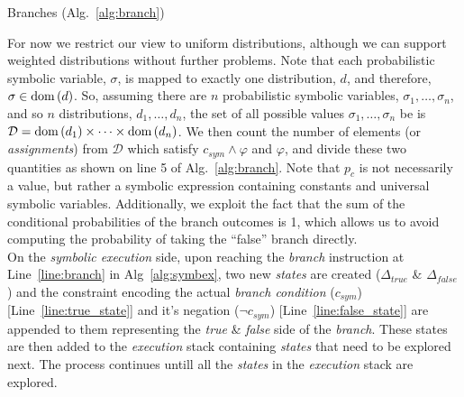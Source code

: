 \begin{paragraph}{Branches (Alg.~\ref{alg:branch})}
	
	For now we restrict our view to uniform distributions, although we can support weighted distributions without further problems.
	Note that each probabilistic symbolic variable, $\sigma$, is mapped to exactly one distribution, $d$, and therefore, $\sigma \in \mathrm{dom}\left( d \right)$.
	So, assuming there are $n$ probabilistic symbolic variables, $\sigma_1,\ldots,\sigma_n$, and so $n$ distributions, $d_1,\ldots,d_n$, the set of all possible values $\sigma_1,\ldots,\sigma_n$ be is $\mathcal{D} = \mathrm{dom}\left( d_1 \right) \times \cdots \times \mathrm{dom}\left( d_n \right)$.
	We then count the number of elements (or \textit{assignments}) from $\mathcal{D}$ which satisfy $c_{sym} \wedge \varphi$ and $\varphi$, and divide these two quantities as shown on line 5 of Alg.~\ref{alg:branch}.
	Note that $p_c$ is not necessarily a value, but rather a symbolic expression containing constants and universal symbolic variables.
	Additionally, we exploit the fact that the sum of the conditional probabilities of the branch outcomes is 1, which allows us to avoid computing the probability of taking the ``false'' branch directly. \\
	On the \textit{symbolic execution} side, upon reaching the \textit{branch} instruction at Line~\ref{line:branch} in Alg~\ref{alg:symbex}, two new \textit{states} are created ($\Delta_{true}$ \& $\Delta_{false}$) and the constraint encoding the actual \textit{branch condition} ($c_{sym}$) [Line~\ref{line:true_state}] and it's negation ($\neg c_{sym}$)  [Line~\ref{line:false_state}] are appended to them representing the \textit{true} \& \textit{false} side of the \textit{branch}. 
	These states are then added to the \textit{execution} stack containing \textit{states} that need to be explored next. The process continues untill all the \textit{states} in the \textit{execution} stack are explored.
\end{paragraph}

